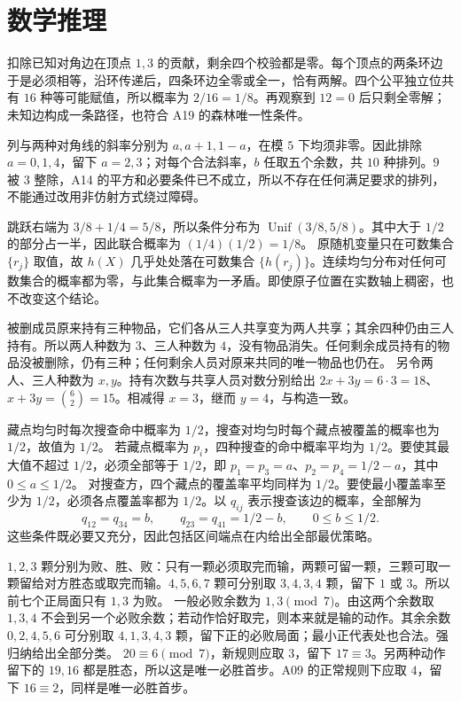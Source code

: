 \section{数学推理}

扣除已知对角边在顶点 $1,3$ 的贡献，剩余四个校验都是零。每个顶点的两条环边于是必须相等，沿环传递后，四条环边全零或全一，恰有两解。四个公平独立位共有 $16$ 种等可能赋值，所以概率为 $2/16=1/8$。再观察到 $12=0$ 后只剩全零解；未知边构成一条路径，也符合 A19 的森林唯一性条件。

列与两种对角线的斜率分别为 $a,a+1,1-a$，在模 $5$ 下均须非零。因此排除 $a=0,1,4$，留下 $a=2,3$；对每个合法斜率，$b$ 任取五个余数，共 $10$ 种排列。$9$ 被 $3$ 整除，A14 的平方和必要条件已不成立，所以不存在任何满足要求的排列，不能通过改用非仿射方式绕过障碍。

跳跃右端为 $3/8+1/4=5/8$，所以条件分布为 $\operatorname{Unif}(3/8,5/8)$。其中大于 $1/2$ 的部分占一半，因此联合概率为 $(1/4)(1/2)=1/8$。
原随机变量只在可数集合 $\{r_j\}$ 取值，故 $h(X)$ 几乎处处落在可数集合 $\{h(r_j)\}$。连续均匀分布对任何可数集合的概率都为零，与此集合概率为一矛盾。即使原子位置在实数轴上稠密，也不改变这个结论。

被删成员原来持有三种物品，它们各从三人共享变为两人共享；其余四种仍由三人持有。所以两人种数为 $3$、三人种数为 $4$，没有物品消失。任何剩余成员持有的物品没被删除，仍有三种；任何剩余人员对原来共同的唯一物品也仍在。
另令两人、三人种数为 $x,y$。持有次数与共享人员对数分别给出 $2x+3y=6\cdot3=18$、$x+3y=\binom62=15$。相减得 $x=3$，继而 $y=4$，与构造一致。

藏点均匀时每次搜查命中概率为 $1/2$，搜查对均匀时每个藏点被覆盖的概率也为 $1/2$，故值为 $1/2$。
若藏点概率为 $p_i$，四种搜查的命中概率平均为 $1/2$。要使其最大值不超过 $1/2$，必须全部等于 $1/2$，即 $p_1=p_3=a$、$p_2=p_4=1/2-a$，其中 $0\le a\le1/2$。
对搜查方，四个藏点的覆盖率平均同样为 $1/2$。要使最小覆盖率至少为 $1/2$，必须各点覆盖率都为 $1/2$。以 $q_{ij}$ 表示搜查该边的概率，全部解为
\[
 q_{12}=q_{34}=b,\qquad q_{23}=q_{41}=1/2-b,
 \qquad0\le b\le1/2.
\]
这些条件既必要又充分，因此包括区间端点在内给出全部最优策略。

$1,2,3$ 颗分别为败、胜、败：只有一颗必须取完而输，两颗可留一颗，三颗可取一颗留给对方胜态或取完而输。$4,5,6,7$ 颗可分别取 $3,4,3,4$ 颗，留下 $1$ 或 $3$。所以前七个正局面只有 $1,3$ 为败。
一般必败余数为 $1,3\pmod7$。由这两个余数取 $1,3,4$ 不会到另一个必败余数；若动作恰好取完，则本来就是输的动作。其余余数 $0,2,4,5,6$ 可分别取 $4,1,3,4,3$ 颗，留下正的必败局面；最小正代表处也合法。强归纳给出全部分类。
$20\equiv6\pmod7$，新规则应取 $3$，留下 $17\equiv3$。另两种动作留下的 $19,16$ 都是胜态，所以这是唯一必胜首步。A09 的正常规则下应取 $4$，留下 $16\equiv2$，同样是唯一必胜首步。

